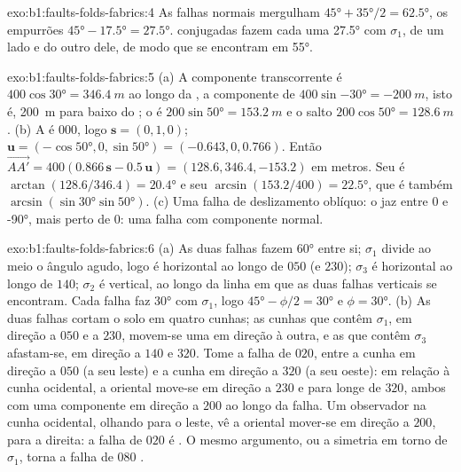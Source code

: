 \begin{solution}{exo:b1:faults-folds-fabrics:4}
As falhas normais mergulham $\ang{45} + \ang{35}/2 = \ang{62.5}$, os empurrões
$\ang{45} - \ang{17.5} = \ang{27.5}$.  conjugadas fazem cada uma
\ang{27.5} com $\sigma_1$, de um lado e do outro dele, de modo que se encontram em \ang{55}.
\end{solution}

\begin{solution}{exo:b1:faults-folds-fabrics:5}
(a) A componente transcorrente é $400\cos\ang{30} = \qty{346.4}{m}$ ao longo da , a componente de  $400\sin\ang{-30} = \qty{-200}{m}$, isto é, \qty{200}{m} para baixo do ; o  é $200\sin\ang{50} = \qty{153.2}{m}$ e o salto $200\cos\ang{50} = \qty{128.6}{m}$. (b) A  é $000$, logo
$\mathbf s = (0, 1, 0)$; $\mathbf u = (-\cos\ang{50}, 0, \sin\ang{50}) =
(-0.643, 0, 0.766)$. Então
$\overrightarrow{AA'} = 400(0.866\,\mathbf s - 0.5\,\mathbf u) =
(128.6, 346.4, -153.2)$ em metros. Seu  é $\arctan(128.6/346.4) =
\ang{20.4}$ e seu  $\arcsin(153.2/400) = \ang{22.5}$, que é também
$\arcsin(\sin\ang{30}\sin\ang{50})$. (c) Uma falha de deslizamento oblíquo: o  jaz
entre $0$ e \ang{-90}, mais perto de $0$: uma falha  com componente normal.
\end{solution}

\begin{solution}{exo:b1:faults-folds-fabrics:6}
(a) As duas falhas fazem \ang{60} entre si; $\sigma_1$ divide ao meio o ângulo agudo, logo é horizontal ao longo de $050$ (e $230$); $\sigma_3$ é horizontal ao longo de $140$; $\sigma_2$ é vertical, ao longo da linha em que as duas falhas verticais se encontram. Cada falha faz \ang{30} com $\sigma_1$, logo $\ang{45} - \phi/2 =
\ang{30}$ e $\phi = \ang{30}$. (b) As duas falhas cortam o solo em quatro cunhas; as cunhas que contêm $\sigma_1$, em direção a $050$ e a $230$, movem-se uma em direção à outra, e as que contêm $\sigma_3$ afastam-se, em direção a $140$ e $320$. Tome a falha de  $020$, entre a cunha em direção a $050$ (a seu leste) e a cunha em direção a $320$ (a seu oeste): em relação à cunha ocidental, a oriental move-se em direção a $230$ e para longe de $320$, ambos com uma componente em direção a $200$ ao longo da falha. Um observador na cunha ocidental, olhando para o leste, vê a oriental mover-se em direção a $200$, para a direita: a falha de  $020$ é . O mesmo argumento, ou a simetria em torno de $\sigma_1$, torna a falha de  $080$ .
\end{solution}

